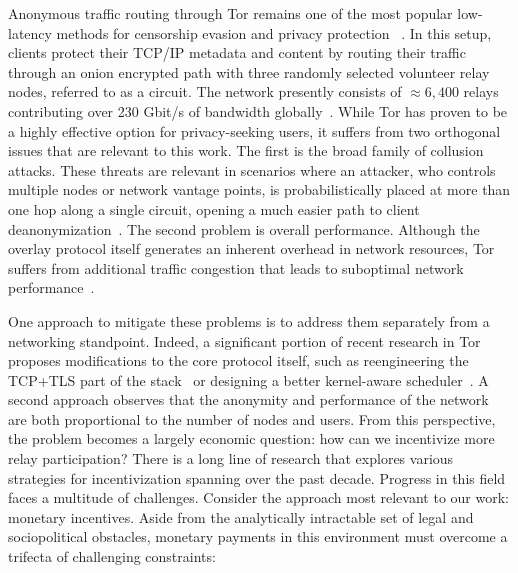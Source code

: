 Anonymous traffic routing through Tor remains one of the most popular
low-latency methods for censorship evasion and privacy protection
~\cite{dingledine2004tor}. In this setup, clients protect their TCP/IP
metadata and content by routing their traffic through an onion
encrypted path with three randomly selected volunteer relay nodes,
referred to as a circuit. The network presently consists of
$\approx 6,400$ relays contributing over 230 Gbit/s of bandwidth
globally~\cite{portal2018tormetrics}. While Tor has proven to be a
highly effective option for privacy-seeking users, it suffers from two
orthogonal issues that are relevant to this work. The first is the
broad family of collusion attacks. These threats are relevant in
scenarios where an attacker, who controls multiple nodes or network
vantage points, is probabilistically placed at more than one hop along
a single circuit,  opening a
much easier path to client
deanonymization~\cite{wright2004predecessor,murdoch2005low}. The
second problem is overall performance. Although the overlay protocol
itself generates an inherent overhead in network resources, Tor
suffers from additional traffic congestion that leads to suboptimal
network performance~\cite{portal2018tormetrics,
  alsabah2016performance}.

One approach to mitigate these problems is to address them separately from a
networking standpoint. Indeed, a significant portion of recent research in Tor
proposes modifications to the core protocol itself, such as reengineering the
TCP+TLS part of the stack~\cite{reardon2009improving} or designing a better
kernel-aware scheduler~\cite{jansen2014never}. A second approach observes that
the anonymity and performance of the network are both proportional to the number
of nodes and users. From this perspective, the problem becomes a largely
economic question: how can we incentivize more relay participation? There is a
long line of research that explores various strategies for incentivization
spanning over the past decade. Progress in this field faces a multitude of
challenges. Consider the approach most relevant to our work: monetary
incentives. Aside from the analytically intractable set of legal and
sociopolitical obstacles, monetary payments in this environment must overcome a
trifecta of challenging constraints:

